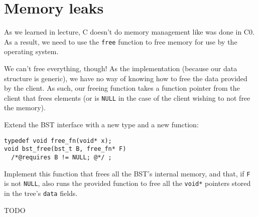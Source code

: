\section*{Memory leaks}

As we learned in lecture, C doesn't do memory management like was done
in C0.  As a result, we need to use the \lstinline'free' function to
free memory for use by the operating system.

We can't free everything, though! As the implementation (because our
data structure is generic), we have no way of knowing how to free the
data provided by the client. As such, our freeing function takes a
function pointer from the client that frees elements (or is
\lstinline'NULL' in the case of the client wishing to not free the
memory).

\begin{part}
Extend the BST interface with a new type and a new function:

\begin{lstlisting}
typedef void free_fn(void* x);
void bst_free(bst_t B, free_fn* F)
  /*@requires B != NULL; @*/ ;
\end{lstlisting}

Implement this function that frees all the BST's internal memory, and
that, if \lstinline'F' is not \lstinline'NULL', also runs the provided
function to free all the \lstinline'void*' pointers stored in the
tree's \lstinline'data' fields.

\begin{solution}
  TODO
\end{solution}
\end{part}
